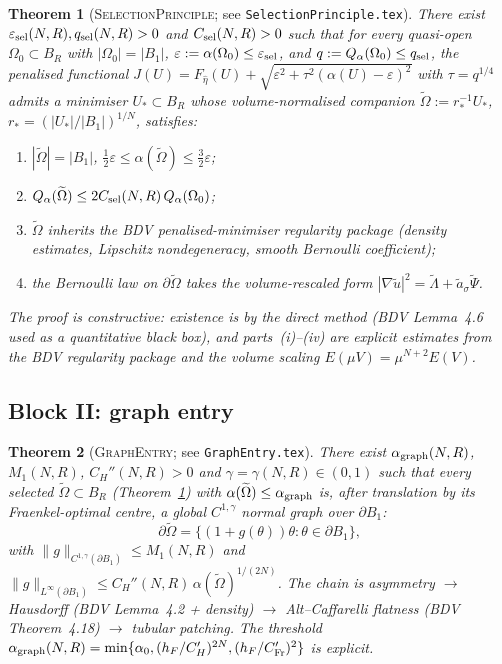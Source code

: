 \documentclass[11pt]{article}
\newtheorem{theorem}{Theorem}[section]
\theoremstyle{definition}
\newcommand{\Om}{\Omega}
\newcommand{\Otilde}{\widetilde{\Omega}}
\newcommand{\eps}{\varepsilon}
\begin{document}
\begin{theorem}[\textsc{SelectionPrinciple}; see
\texttt{SelectionPrinciple.tex}]\label{thm:S}
There exist $\eps_{\rm sel}(N,R), q_{\rm sel}(N,R)>0$ and
$C_{\rm sel}(N,R)>0$ such that for every quasi-open
$\Om_0\subset B_R$ with $|\Om_0|=|B_1|$,
$\eps:=\alpha(\Om_0)\le\eps_{\rm sel}$, and
$q:=Q_\alpha(\Om_0)\le q_{\rm sel}$, the penalised functional
$J(U)=F_{\hat\eta}(U)+\sqrt{\eps^2+\tau^2(\alpha(U)-\eps)^2}$
with $\tau=q^{1/4}$ admits a minimiser $U_*\subset B_R$ whose
volume-normalised companion
$\Otilde:=r_*^{-1}U_*$, $r_*=(|U_*|/|B_1|)^{1/N}$, satisfies:
\begin{enumerate}
\item[\rm(i)] $|\Otilde|=|B_1|$, $\tfrac12\eps\le\alpha(\Otilde)\le\tfrac32\eps$;
\item[\rm(ii)] $Q_\alpha(\Otilde)\le 2C_{\rm sel}(N,R)\,Q_\alpha(\Om_0)$;
\item[\rm(iii)] $\Otilde$ inherits the BDV penalised-minimiser regularity
package (density estimates, Lipschitz nondegeneracy, smooth Bernoulli
coefficient);
\item[\rm(iv)] the Bernoulli law on $\partial\Otilde$ takes the
volume-rescaled form $|\nabla\widetilde u|^2=\widetilde\Lambda+\widetilde
a_\sigma\widetilde\Psi$.
\end{enumerate}
The proof is constructive: existence is by the direct method (BDV
Lemma~4.6 used as a quantitative black box), and parts~(i)--(iv) are
explicit estimates from the BDV regularity package and the volume
scaling $E(\mu V)=\mu^{N+2}E(V)$.
\end{theorem}

\subsection{Block II: graph entry}

\begin{theorem}[\textsc{GraphEntry}; see \texttt{GraphEntry.tex}]\label{thm:G}
There exist
$\alpha_{\rm graph}(N,R)$, $M_1(N,R)$, $C_H''(N,R)>0$ and
$\gamma=\gamma(N,R)\in(0,1)$ such that every selected
$\Otilde\subset B_R$ (Theorem~\ref{thm:S}) with
$\alpha(\Otilde)\le\alpha_{\rm graph}$ is, after translation by its
Fraenkel-optimal centre, a global $C^{1,\gamma}$ normal graph over
$\partial B_1$:
\[
\partial\Otilde=\bigl\{(1+g(\theta))\theta:\theta\in\partial B_1\bigr\},
\]
with $\|g\|_{C^{1,\gamma}(\partial B_1)}\le M_1(N,R)$ and
$\|g\|_{L^\infty(\partial B_1)}\le C_H''(N,R)\,\alpha(\Otilde)^{1/(2N)}$.
The chain is asymmetry $\to$ Hausdorff (BDV Lemma~4.2 + density) $\to$
Alt--Caffarelli flatness (BDV Theorem~4.18) $\to$ tubular
patching. The threshold
$\alpha_{\rm graph}(N,R)=
\min\{\alpha_0,(h_F/C_H')^{2N},(h_F/C_{\rm Fr}')^2\}$ is explicit.
\end{theorem}
\end{document}
